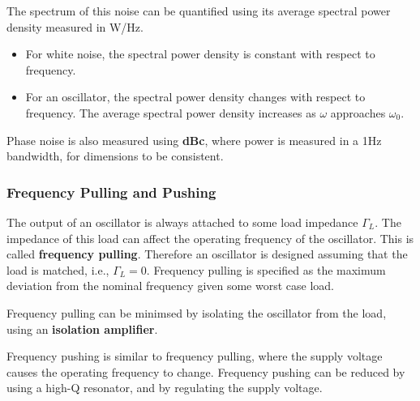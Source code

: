 \documentclass{article}
\begin{document}
The spectrum of this noise can be quantified using its average spectral
power density measured in \unit{W/Hz}.
\begin{itemize}
    \item For white noise, the spectral power density is constant with
          respect to frequency.
    \item For an oscillator, the spectral power density changes with
          respect to frequency. The average spectral power density
          increases as \(\omega\) approaches \(\omega_0\).
\end{itemize}
Phase noise is also measured using \textbf{dBc}, where power is measured
in a 1Hz bandwidth, for dimensions to be consistent.
\subsubsection{Frequency Pulling and Pushing}
The output of an oscillator is always attached to some load impedance
\(\Gamma_L\). The impedance of this load can affect the operating
frequency of the oscillator. This is called \textbf{frequency pulling}.
Therefore an oscillator is designed assuming that the load is matched,
i.e., \(\Gamma_L = 0\). Frequency pulling is specified as the maximum
deviation from the nominal frequency given some worst case load.

Frequency pulling can be minimsed by isolating the oscillator from the
load, using an \textbf{isolation amplifier}.

Frequency pushing is similar to frequency pulling, where the supply
voltage causes the operating frequency to change. Frequency pushing can
be reduced by using a high-Q resonator, and by regulating the supply
voltage.
\end{document}
